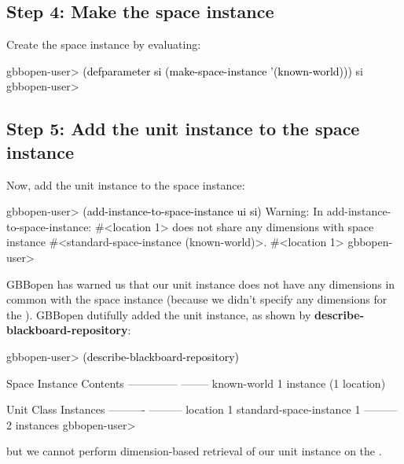 \documentclass[10pt,twoside,english,pdftex]{article}
\begin{document}
\subsection*{Step 4: Make  the  space instance}

%
Create the  space instance by evaluating:
%
\W\supp
\begin{example}
\textcolor{darkergray}{%
  gbbopen-user> \textcolor{black}{(defparameter si (make-space-instance '(known-world)))}
  si
  gbbopen-user>}
\end{example}

\subsection*{Step 5: Add the unit instance to the space instance}

%
Now, add the  unit instance to the space instance:
%
\W\supp
\begin{example}
\textcolor{darkergray}{%
  gbbopen-user> \textcolor{black}{(add-instance-to-space-instance ui si)}
  Warning: In add-instance-to-space-instance: #<location 1>
           does not share any dimensions with space instance 
           #<standard-space-instance (known-world)>.
  #<location 1>
  gbbopen-user>}
\end{example}

%
GBBopen has warned us that our  unit instance does not
have any dimensions in common with the  space
instance (because we didn't specify any dimensions for the
).  GBBopen dutifully added the unit instance, as
shown by \textbf{describe-blackboard-repository}:
%
\W\supp
\begin{example}
\textcolor{darkergray}{%
  gbbopen-user> \textcolor{black}{(describe-blackboard-repository)}
  
  Space Instance                Contents
  --------------                --------
  known-world                   1 instance (1 location)

  Unit Class                    Instances
  ----------                    ---------
  location                              1
  standard-space-instance               1
                                ---------
                                        2 instances
  gbbopen-user>}
\end{example}
%
but we cannot perform dimension-based retrieval of our 
unit instance on the .
\end{document}
